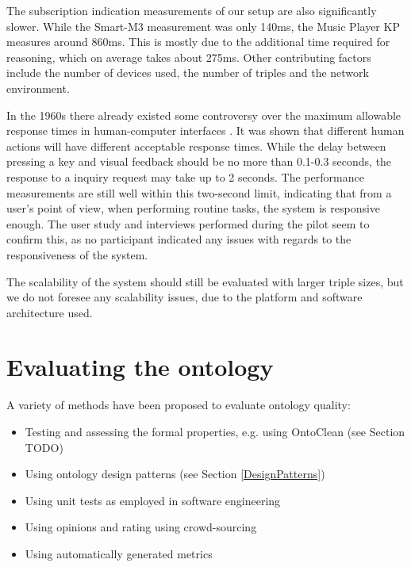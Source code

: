 The subscription indication measurements of our setup are also significantly slower. While the Smart-M3 measurement was only 140ms, the Music Player KP measures around 860ms. This is mostly due to the additional time required for reasoning, which on average takes about 275ms. Other contributing factors include the number of devices used, the number of triples and the network environment.

In the 1960s there already existed some controversy over the maximum allowable response times in human-computer interfaces \cite{Miller1968}. It was shown that different human actions will have different acceptable response times. While the delay between pressing a key and visual feedback should be no more than 0.1-0.3 seconds, the response to a inquiry request may take up to 2 seconds. The performance measurements are still well within this two-second limit, indicating that from a user's point of view, when performing routine tasks, the system is responsive enough. The user study and interviews performed during the pilot seem to confirm this, as no participant indicated any issues with regards to the responsiveness of the system.

The scalability of the system should still be evaluated with larger triple sizes, but we do not foresee any scalability issues, due to the platform and software architecture used. 





\section{Evaluating the ontology}

A variety of methods have been proposed \cite{DAquin2011} to evaluate ontology quality:

\begin{itemize}
	\item Testing and assessing the formal properties, e.g. using OntoClean (see Section TODO)
	\item Using ontology design patterns (see Section \ref{DesignPatterns})
	\item Using unit tests as employed in software engineering
	\item Using opinions and rating using crowd-sourcing
	\item Using automatically generated metrics
\end{itemize}


